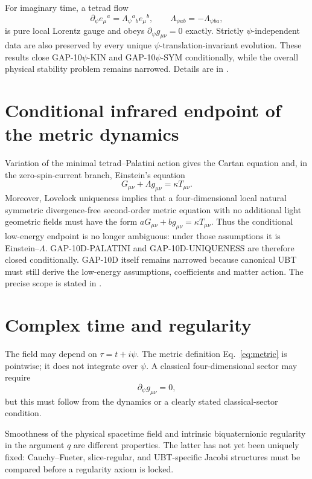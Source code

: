 \documentclass[12pt,a4paper]{article}
\theoremstyle{remark}\newtheorem{remark}[definition]{Remark}
\begin{document}
For imaginary time, a tetrad flow
\begin{equation}
 \partial_\psi e_\mu{}^a=\Lambda_\psi{}^a{}_b e_\mu{}^b,
 \qquad \Lambda_{\psi ab}=-\Lambda_{\psi ba},
 \label{eq:psi-gauge-paper}
\end{equation}
is pure local Lorentz gauge and obeys
$\partial_\psi g_{\mu\nu}=0$ exactly.  Strictly $\psi$-independent data are
also preserved by every unique $\psi$-translation-invariant evolution.  These
results close GAP-10$\psi$-KIN and GAP-10$\psi$-SYM conditionally, while the
overall physical stability problem remains narrowed.  Details are in
.

\section{Conditional infrared endpoint of the metric dynamics}
Variation of the minimal tetrad--Palatini action gives the Cartan equation and,
in the zero-spin-current branch, Einstein's equation
\begin{equation}
 G_{\mu\nu}+\Lambda g_{\mu\nu}=\kappa T_{\mu\nu}.
 \label{eq:Einstein-IR-paper}
\end{equation}
Moreover, Lovelock uniqueness implies that a four-dimensional local natural
symmetric divergence-free second-order metric equation with no additional
light geometric fields must have the form
$aG_{\mu\nu}+bg_{\mu\nu}=\kappa T_{\mu\nu}$.  Thus the conditional low-energy
endpoint is no longer ambiguous: under those assumptions it is
Einstein--$\Lambda$.  GAP-10D-PALATINI and GAP-10D-UNIQUENESS are therefore
closed conditionally.  GAP-10D itself remains narrowed because canonical UBT
must still derive the low-energy assumptions, coefficients and matter action.
The precise scope is stated in
.

\section{Complex time and regularity}
The field may depend on $\tau=t+i\psi$.  The metric definition
Eq.~\eqref{eq:metric} is pointwise; it does not integrate over $\psi$.  A
classical four-dimensional sector may require
\[
 \partial_\psi g_{\mu\nu}=0,
\]
but this must follow from the dynamics or a clearly stated classical-sector
condition.

Smoothness of the physical spacetime field and intrinsic biquaternionic
regularity in the argument $q$ are different properties.  The latter has not
yet been uniquely fixed: Cauchy--Fueter, slice-regular, and UBT-specific Jacobi
structures must be compared before a regularity axiom is locked.
\end{document}
